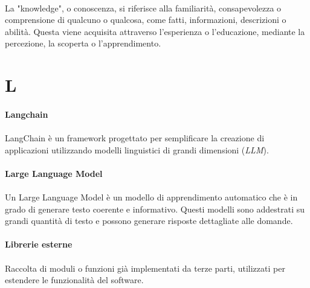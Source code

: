 \documentclass[10pt, a4paper]{article}
\begin{document}
\paragraph{}La "knowledge", o conoscenza, si riferisce alla familiarità, consapevolezza o comprensione di qualcuno o qualcosa, come fatti, informazioni, descrizioni o abilità. Questa viene acquisita attraverso l’esperienza o l’educazione, mediante la percezione, la scoperta o l’apprendimento.



\newpage
\section{L}
\vspace{2em}
\paragraph{Langchain}\noindent\hrulefill
\paragraph{}LangChain è un framework progettato per semplificare la creazione di applicazioni utilizzando modelli linguistici di grandi dimensioni (\textit{LLM\pg}).

\vspace{2em}
\paragraph{Large Language Model}\noindent\hrulefill
\paragraph{}Un Large Language Model è un modello di apprendimento automatico che è in grado di generare testo coerente e informativo. Questi modelli sono addestrati su grandi quantità di testo e possono generare risposte dettagliate alle domande.

\vspace{2em}
\paragraph{Librerie esterne}\noindent\hrulefill
\paragraph{}Raccolta di moduli o funzioni già implementati da terze parti, utilizzati per estendere le funzionalità del software.
\end{document}

